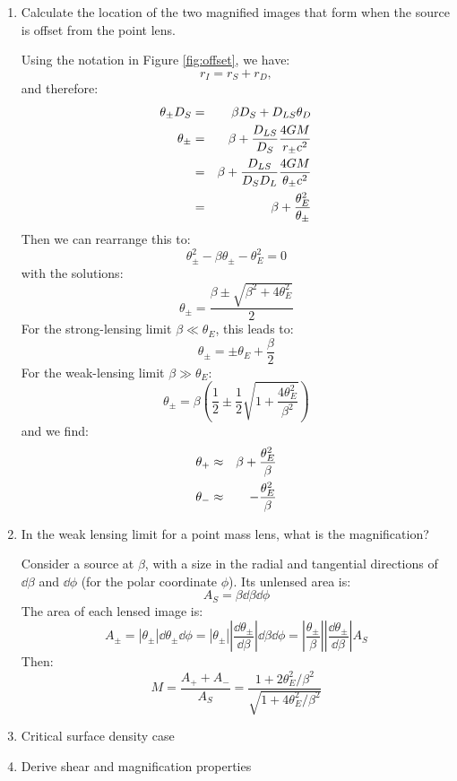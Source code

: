 \begin{enumerate}
\item Calculate the location of the two magnified images that form when the
source is offset from the point lens.
\begin{answer}
Using the notation in Figure \ref{fig:offset}, we have:
\begin{equation}
r_I = r_S + r_D,
\end{equation}
and therefore:
\begin{eqnarray}
\theta_\pm D_S &=& \beta D_S + D_{LS} \theta_D \cr
\theta_\pm &=& \beta + \frac{D_{LS}}{D_S} \frac{4GM}{r_\pm c^2} \cr
&=& \beta + \frac{D_{LS}}{D_S D_L} \frac{4GM}{\theta_\pm c^2} \cr
&=& \beta + \frac{\theta_E^2}{\theta_\pm}
\end{eqnarray}
Then we can rearrange this to:
\begin{equation}
\theta_\pm^2 - \beta \theta_\pm - \theta_E^2 = 0 
\end{equation}
with the solutions:
\begin{equation}
\theta_\pm = \frac{\beta \pm \sqrt{\beta^2 + 4\theta_E^2}}{2}
\end{equation}
For the strong-lensing limit $\beta \ll \theta_E$, this leads to:
\begin{equation}
\theta_\pm = \pm \theta_E + \frac{\beta}{2}
\end{equation}
For the weak-lensing limit $\beta \gg \theta_E$:
\begin{equation}
\theta_\pm
= \beta \left(\frac{1}{2} \pm \frac{1}{2} \sqrt{1+
\frac{4\theta_E^2}{\beta^2}}\right) 
\end{equation}
and we find:
\begin{eqnarray}
\theta_+ &\approx& \beta + \frac{\theta_E^2}{\beta} \cr
\theta_- &\approx& - \frac{\theta_E^2}{\beta}
\end{eqnarray}
\end{answer}
\item In the weak lensing limit for a point mass lens,  what is the
magnification?
\begin{answer}
Consider a source at $\beta$, with a size in the radial and tangential
directions of $\dd\beta$ and $\dd\phi$ (for the polar coordinate
$\phi$). Its unlensed area is:
\begin{equation}
A_S = \beta \dd\beta \dd\phi
\end{equation}
The area of each lensed image is:
\begin{equation}
A_\pm = \left| \theta_\pm\right| \dd\theta_\pm \dd\phi
= \left| \theta_\pm\right| \left|\frac{\dd\theta_\pm}{\dd\beta}\right| \dd\beta\dd\phi
= \left|\frac{\theta_\pm}{\beta}\right| \left|\frac{\dd\theta_\pm}{\dd\beta}\right| A_S
\end{equation}
Then:
\begin{equation}
M = \frac{A_+ + A_-}{A_S} = \frac{1+
2\theta_E^2/\beta^2}{\sqrt{1+4\theta_E^2/\beta^2} }
\end{equation}
\end{answer}
\item Critical surface density case
\item Derive shear and magnification properties
\end{enumerate}

